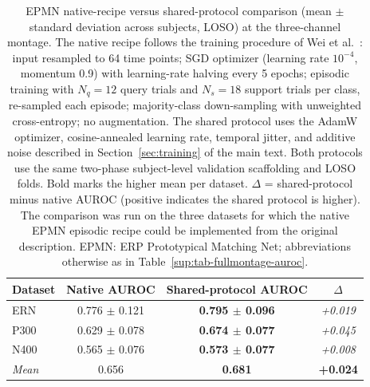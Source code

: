 \begin{table}[t]
\centering
\setlength{\tabcolsep}{6pt}
\caption{%
EPMN native-recipe versus shared-protocol comparison (mean $\pm$ standard deviation across subjects, LOSO) at the three-channel montage. The native recipe follows the training procedure of Wei et al.\ \cite{wei2022}: input resampled to 64 time points; SGD optimizer (learning rate $10^{-4}$, momentum 0.9) with learning-rate halving every 5 epochs; episodic training with $N_q = 12$ query trials and $N_s = 18$ support trials per class, re-sampled each episode; majority-class down-sampling with unweighted cross-entropy; no augmentation. The shared protocol uses the AdamW optimizer, cosine-annealed learning rate, temporal jitter, and additive noise described in Section~\ref{sec:training} of the main text. Both protocols use the same two-phase subject-level validation scaffolding and LOSO folds. Bold marks the higher mean per dataset. $\Delta$ = shared-protocol minus native AUROC (positive indicates the shared protocol is higher). The comparison was run on the three datasets for which the native EPMN episodic recipe could be implemented from the original description. EPMN: ERP Prototypical Matching Net; abbreviations otherwise as in Table~\ref{sup:tab-fullmontage-auroc}.%
}
\label{sup:tab-epmn-native}
\begin{tabular}{lccc}
\toprule
Dataset & Native AUROC & Shared-protocol AUROC & $\Delta$ \\
\midrule
ERN & 0.776 $\pm$ 0.121 & \textbf{0.795 $\pm$ 0.096} & \textit{+0.019} \\
P300 & 0.629 $\pm$ 0.078 & \textbf{0.674 $\pm$ 0.077} & \textit{+0.045} \\
N400 & 0.565 $\pm$ 0.076 & \textbf{0.573 $\pm$ 0.077} & \textit{+0.008} \\
\midrule
\textit{Mean} & 0.656 & \textbf{0.681} & \textbf{+0.024} \\
\bottomrule
\end{tabular}
\end{table}
